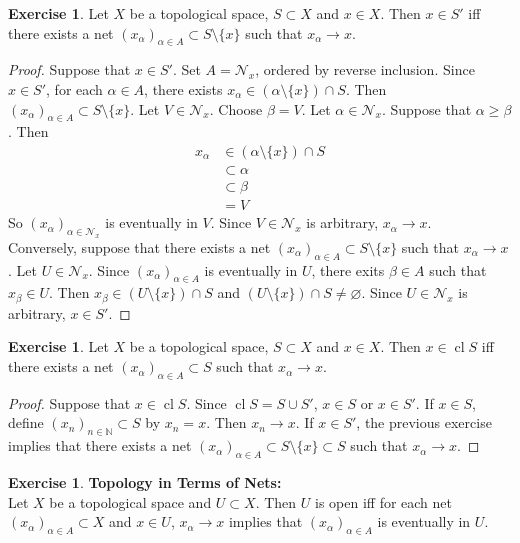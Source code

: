 \documentclass[12pt]{amsart}
\theoremstyle{definition}
\newtheorem{ex}[definition]{Exercise}
\newcommand{\al}{\alpha}
\newcommand{\be}{\beta}
\newcommand{\N}{\mathbb{N}}
\newcommand{\MN}{\mathcal{N}}
\newcommand{\tbf}[1]{\textbf{#1}}
\DeclareMathOperator{\cl}{cl}
\DeclareMathOperator*{\0}{\mbf{0}}
\DeclareMathOperator*{\1}{\mbf{1}}
\newcommand{\lex}[1]{\label{ex:#1}}
\begin{document}
	\begin{ex} \lex{33008}
	Let $X$ be a topological space, $S \subset X$ and $x \in X$. Then $x \in S'$ iff there exists a net $(x_{\al})_{\al \in A} \subset S \setminus \{x\}$ such that $x_{\al} \rightarrow x$. 
	\end{ex}

	\begin{proof}
	Suppose that $x \in S'$. Set $A = \MN_x$, ordered by reverse inclusion.  Since $x \in S'$, for each $\al \in A$, there exists $x_\al \in (\al \setminus \{x\}) \cap S.$ Then $(x_{\al})_{\al \in A} \subset S \setminus \{x\}$. Let $V \in \MN_x$. Choose $\be = V$. Let $\al \in \MN_x$. Suppose that $\al \geq \be$. Then 
	\begin{align*}
	x_{\al} 
	&\in (\al \setminus \{x\}) \cap S \\
	& \subset \al \\
	& \subset \be \\
	&= V
\end{align*}	
	So $(x_{\al})_{\al \in \MN_x}$ is eventually in $V$. Since $V \in \MN_x$ is arbitrary, $x_{\al } \rightarrow x$. \\
	Conversely, suppose that there exists a net $(x_{\al})_{\al \in A} \subset S \setminus \{x\}$ such that $x_{\al} \rightarrow x$. Let $U \in \MN_x$. Since $(x_{\al})_{\al \in A}$ is eventually in $U$, there exits $\be \in A$ such that $x_{\be} \in U$. Then $x_{\be} \in (U \setminus \{x\}) \cap S$ and $(U \setminus \{x\}) \cap S \neq \varnothing$. Since $U \in \MN_x$ is arbitrary, $x \in S'$.
	\end{proof}
	
	\begin{ex} \lex{33009}
	Let $X$ be a topological space, $S \subset X$ and $x \in X$. Then $x \in \cl S$ iff there exists a net $(x_{\al})_{\al \in A} \subset S$ such that $x_{\al} \rightarrow x$. 
	\end{ex}

	\begin{proof}
	Suppose that $x \in \cl S$. Since $\cl S = S \cup S'$, $x \in S$ or $x \in S'$. If $x \in S$, define $(x_n)_{n \in \N} \subset S$ by $x_n = x$. Then $x_n \rightarrow x$. If $x \in S'$, the previous exercise implies that there exists a net $(x_{\al})_{\al \in A} \subset S \setminus \{x\} \subset S$ such that $x_{\al} \rightarrow x$. 
	\end{proof}

	\begin{ex} \tbf{Topology in Terms of Nets: } \\
		Let $X$ be a topological space and $U \subset X$. Then $U$ is open iff for each net $(x_{\al})_{\al \in A} \subset X$ and $x \in U$, $x_{\al} \rightarrow x$ implies that $(x_{\al})_{\al \in A} $ is eventually in $U$.
	\end{ex}
\end{document}
